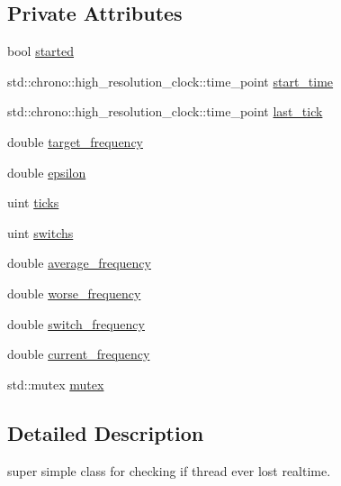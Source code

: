 \subsection*{Private Attributes}
\begin{DoxyCompactItemize}
\item 
bool \hyperlink{classreal__time__tools_1_1RealTimeCheck_a21b5703a3c61b09955d94d06a3562667}{started}
\item 
std\+::chrono\+::high\+\_\+resolution\+\_\+clock\+::time\+\_\+point \hyperlink{classreal__time__tools_1_1RealTimeCheck_a969600ce8ecc4ec48bbf59e8d669749e}{start\+\_\+time}
\item 
std\+::chrono\+::high\+\_\+resolution\+\_\+clock\+::time\+\_\+point \hyperlink{classreal__time__tools_1_1RealTimeCheck_a3e200c0376362dcc9a7db7d77a124931}{last\+\_\+tick}
\item 
double \hyperlink{classreal__time__tools_1_1RealTimeCheck_a126c13a50d06703c515b35f87c3e867c}{target\+\_\+frequency}
\item 
double \hyperlink{classreal__time__tools_1_1RealTimeCheck_ab6a059be584e4a92254002d35713d0df}{epsilon}
\item 
uint \hyperlink{classreal__time__tools_1_1RealTimeCheck_ae2acb20d9f1e49cc35eb5505d63201aa}{ticks}
\item 
uint \hyperlink{classreal__time__tools_1_1RealTimeCheck_acc235579eeb245f043fd188790540fa9}{switchs}
\item 
double \hyperlink{classreal__time__tools_1_1RealTimeCheck_a3ffb6de7e7c01a7248c2293e29b98011}{average\+\_\+frequency}
\item 
double \hyperlink{classreal__time__tools_1_1RealTimeCheck_a3605c41d8c5c616879fa9af469860470}{worse\+\_\+frequency}
\item 
double \hyperlink{classreal__time__tools_1_1RealTimeCheck_a235895032a789539a8ba957caac621ec}{switch\+\_\+frequency}
\item 
double \hyperlink{classreal__time__tools_1_1RealTimeCheck_a935b4c6b8ebf569e6510d47376f8499f}{current\+\_\+frequency}
\item 
std\+::mutex \hyperlink{classreal__time__tools_1_1RealTimeCheck_a3a7cc4ef87fac5e4052a3240aced88d1}{mutex}
\end{DoxyCompactItemize}


\subsection{Detailed Description}
super simple class for checking if thread ever lost realtime. 

